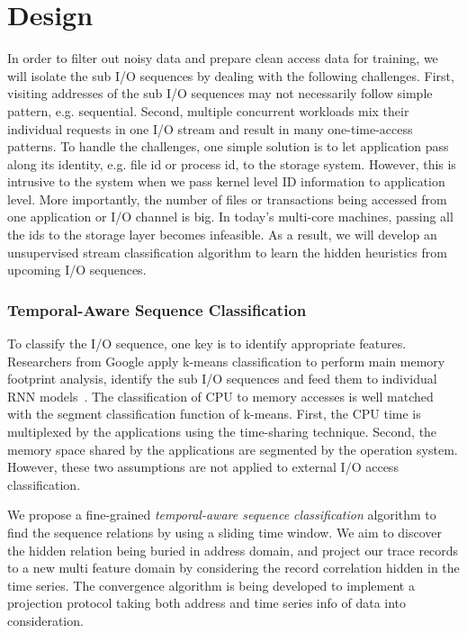 \section{Design}


In order to filter out noisy data and prepare clean access data for training, we will isolate the sub I/O sequences by dealing with the following challenges. First, visiting addresses of the sub I/O sequences may not necessarily follow simple pattern, e.g. sequential. Second, multiple concurrent workloads mix their individual requests in one I/O stream and result in many one-time-access patterns. To handle the challenges, one simple solution is to let application pass along its identity, e.g. file id or process id, to the storage system. However, this is intrusive to the system when we pass kernel level ID information to application level. More importantly, the number of files or transactions being accessed from one application or I/O channel is big. In today's multi-core machines, passing all the ids to the storage layer becomes infeasible. As a result, we will develop an unsupervised stream classification algorithm to learn the hidden heuristics from upcoming I/O sequences.

\subsubsection*{Temporal-Aware Sequence Classification}

To classify the I/O sequence,
one key is to identify appropriate features.
Researchers from Google apply k-means classification to perform main memory
footprint analysis, identify the sub I/O sequences and feed them
to individual RNN models~\cite{hashemi2018learning}.
The classification of CPU to memory accesses is well matched with
the segment classification function of k-means.
First, the CPU time is multiplexed by the applications using the time-sharing technique.
Second, the memory space shared by the applications are segmented
by the operation system.
However, these two assumptions are not applied to external I/O access classification.

We propose a fine-grained \emph{temporal-aware sequence classification} algorithm
to find the sequence relations by using a sliding time window.
We aim to discover the hidden relation being buried in address domain,
and project our trace records to a new multi feature domain
by considering the record correlation hidden in the time series.
The convergence algorithm is being developed to implement a projection protocol
taking both address and time series info of data into consideration.

